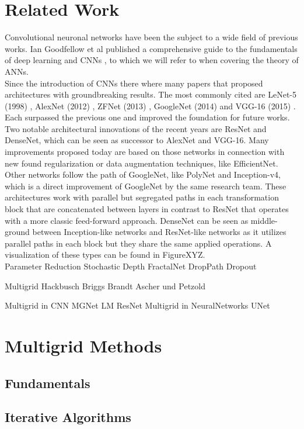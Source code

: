 \documentclass[a4paper,12pt,titlepage,enabledeprecatedfontcommands]{scrreprt}
\begin{document}
\chapter{Related Work}
Convolutional neuronal networks have been the subject to a wide field of previous works. Ian Goodfellow et al published a comprehensive guide to the fundamentals of deep learning and CNNs \cite{Goodfellow-et-al-2016}, to which we will refer to when covering the theory of ANNs. \\
Since the introduction of CNNs there where many papers that proposed architectures with groundbreaking results. The most commonly cited are LeNet-5 (1998) \cite{LeNet}, AlexNet (2012) \cite{AlexNet}, ZFNet (2013) \cite{zeiler2013visualizing}, GoogleNet (2014)\cite{szegedy2014going} and VGG-16 (2015) \cite{simonyan2015deep}. Each surpassed the previous one and improved the foundation for future works.\\ Two notable architectural innovations of the recent years are ResNet and DenseNet, which can be seen as successor to AlexNet and VGG-16. Many improvements proposed today are based on those networks in connection with new found regularization or data augmentation techniques, like EfficientNet. Other networks follow the path of GoogleNet, like PolyNet and Inception-v4, which is a direct improvement of GoogleNet by the same research team. These architectures work with parallel but segregated paths in each transformation block that are concatenated between layers in contrast to ResNet that operates with a more classic feed-forward approach. DenseNet can be seen as middle-ground between Inception-like networks and ResNet-like networks as it utilizes parallel paths in each block but they share the same applied operations. A visualization of these types can be found in FigureXYZ. \\

Parameter Reduction
Stochastic Depth
FractalNet DropPath
Dropout

Multigrid
Hackbusch
Briggs
Brandt
Ascher und Petzold

Multigrid in CNN
MGNet
LM ResNet
Multigrid in NeuralNetworks
UNet

\chapter{Multigrid Methods}
\section{Fundamentals}
\section{Iterative Algorithms}
\end{document}
